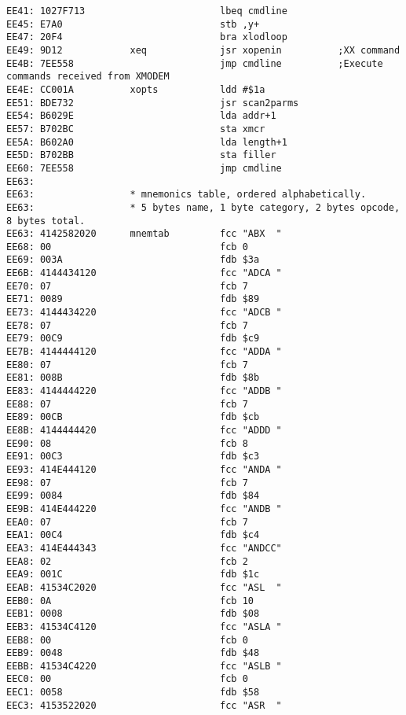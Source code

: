{\begin{verbatim}
EE41: 1027F713                        lbeq cmdline                                    
EE45: E7A0                            stb ,y+
EE47: 20F4                            bra xlodloop
EE49: 9D12            xeq             jsr xopenin          ;XX command
EE4B: 7EE558                          jmp cmdline          ;Execute commands received from XMODEM
EE4E: CC001A          xopts           ldd #$1a
EE51: BDE732                          jsr scan2parms
EE54: B6029E                          lda addr+1
EE57: B702BC                          sta xmcr
EE5A: B602A0                          lda length+1
EE5D: B702BB                          sta filler
EE60: 7EE558                          jmp cmdline
EE63:                         
EE63:                 * mnemonics table, ordered alphabetically.
EE63:                 * 5 bytes name, 1 byte category, 2 bytes opcode, 8 bytes total.
EE63: 4142582020      mnemtab         fcc "ABX  "
EE68: 00                              fcb 0
EE69: 003A                            fdb $3a
EE6B: 4144434120                      fcc "ADCA "
EE70: 07                              fcb 7
EE71: 0089                            fdb $89
EE73: 4144434220                      fcc "ADCB "
EE78: 07                              fcb 7
EE79: 00C9                            fdb $c9
EE7B: 4144444120                      fcc "ADDA "
EE80: 07                              fcb 7
EE81: 008B                            fdb $8b
EE83: 4144444220                      fcc "ADDB "
EE88: 07                              fcb 7
EE89: 00CB                            fdb $cb 
EE8B: 4144444420                      fcc "ADDD "
EE90: 08                              fcb 8
EE91: 00C3                            fdb $c3
EE93: 414E444120                      fcc "ANDA "
EE98: 07                              fcb 7
EE99: 0084                            fdb $84
EE9B: 414E444220                      fcc "ANDB "
EEA0: 07                              fcb 7
EEA1: 00C4                            fdb $c4
EEA3: 414E444343                      fcc "ANDCC"
EEA8: 02                              fcb 2
EEA9: 001C                            fdb $1c
EEAB: 41534C2020                      fcc "ASL  "
EEB0: 0A                              fcb 10
EEB1: 0008                            fdb $08
EEB3: 41534C4120                      fcc "ASLA "
EEB8: 00                              fcb 0
EEB9: 0048                            fdb $48
EEBB: 41534C4220                      fcc "ASLB "
EEC0: 00                              fcb 0
EEC1: 0058                            fdb $58
EEC3: 4153522020                      fcc "ASR  "

\end{verbatim}}
